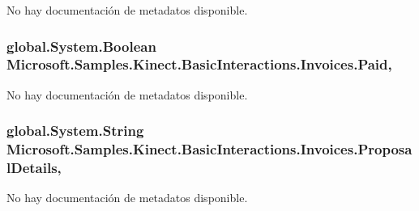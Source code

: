 No hay documentación de metadatos disponible. 

\hypertarget{class_microsoft_1_1_samples_1_1_kinect_1_1_basic_interactions_1_1_invoices_accf0a49573b14a21c49e17f2d249ba00}{
\subsubsection[{Paid}]{\setlength{\rightskip}{0pt plus 5cm}global.\-System.\-Boolean Microsoft.\-Samples.\-Kinect.\-Basic\-Interactions.\-Invoices.\-Paid\hspace{0.3cm}{\ttfamily [get]}, {\ttfamily [set]}}}\label{class_microsoft_1_1_samples_1_1_kinect_1_1_basic_interactions_1_1_invoices_accf0a49573b14a21c49e17f2d249ba00}


No hay documentación de metadatos disponible. 

\hypertarget{class_microsoft_1_1_samples_1_1_kinect_1_1_basic_interactions_1_1_invoices_a6ac2ba1cce7874944e48e6556a19d51d}{
\subsubsection[{Proposal\-Details}]{\setlength{\rightskip}{0pt plus 5cm}global.\-System.\-String Microsoft.\-Samples.\-Kinect.\-Basic\-Interactions.\-Invoices.\-Proposal\-Details\hspace{0.3cm}{\ttfamily [get]}, {\ttfamily [set]}}}\label{class_microsoft_1_1_samples_1_1_kinect_1_1_basic_interactions_1_1_invoices_a6ac2ba1cce7874944e48e6556a19d51d}


No hay documentación de metadatos disponible. 

